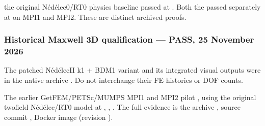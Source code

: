 \documentclass[letterpaper,10pt,english]{sphinxmanual}
\begin{document}
\sphinxAtStartPar
{} the original
Nédélec0/RT0 physics baseline passed
at . Both the  passed separately
at  on MPI1 and MPI2.
These are distinct archived proofs.


\subsubsection{Historical  Maxwell 3D qualification — PASS, 25 November 2026}
\label{\detokenize{examples/maxwell_3d:historical-baseline-maxwell-3d-qualification-pass-25-november-2026}}
\sphinxAtStartPar
{}
The  patched Nédélec\sphinxhyphen{}II k1 + BDM1
variant and its integrated visual outputs
were  in the native
archive .
Do not interchange their FE histories or DOF counts.

\sphinxAtStartPar
The earlier GetFEM/PETSc/MUMPS MPI1 and MPI2 pilot
,
using the original two\sphinxhyphen{}field Nédélec/RT0
model at , , .
The full evidence is the archive
,
source commit
,
Docker image 
(revision
).
\end{document}
